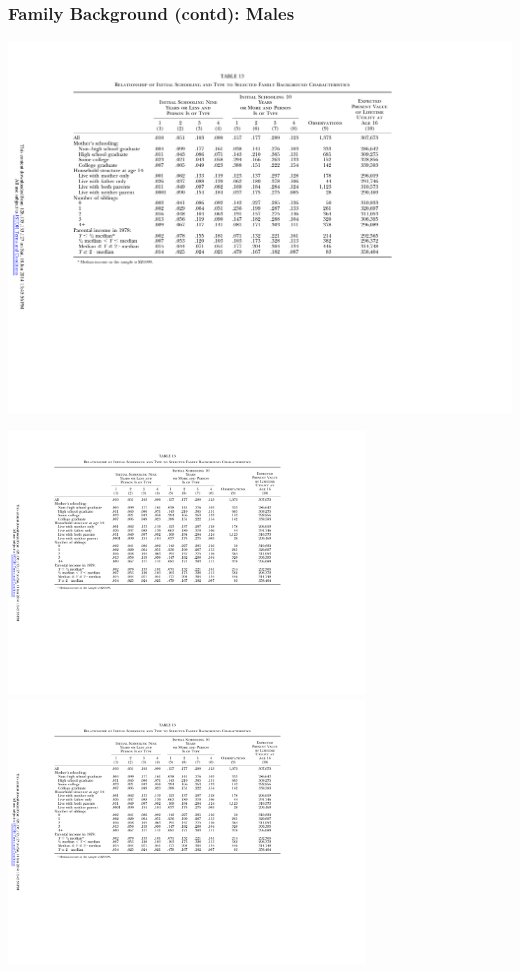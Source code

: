 \begin{frame}
	\frametitle{Family Background (contd): Males}
	\includegraphics[width=\textwidth]{tab-figs/table13_1997_header}	\\
	\begin{center}
	\includegraphics[height=2.75in]{tab-figs/table13_1997_left} \includegraphics[height=2.75in]{tab-figs/table13b_1997}	\\

\end{center}
\end{frame}
